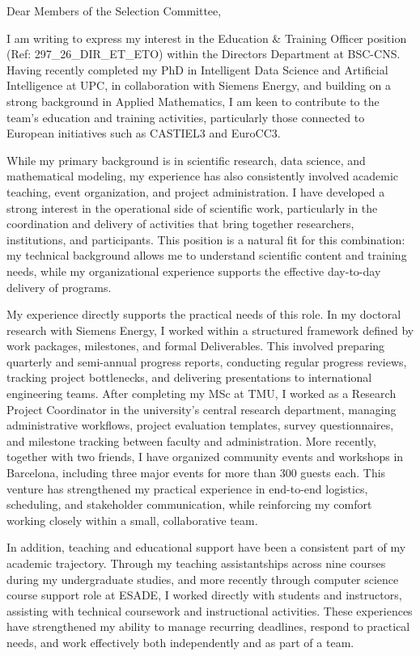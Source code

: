 \documentclass[11pt,a4paper]{article}
\begin{document}
\thispagestyle{empty}

Dear Members of the Selection Committee,

I am writing to express my interest in the Education \& Training Officer position (Ref: 297\_26\_\allowbreak DIR\_\allowbreak ET\_\allowbreak ETO) within the Directors Department at BSC-CNS. Having recently completed my PhD in Intelligent Data Science and Artificial Intelligence at UPC, in collaboration with Siemens Energy, and building on a strong background in Applied Mathematics, I am keen to contribute to the team's education and training activities, particularly those connected to European initiatives such as CASTIEL3 and EuroCC3.

While my primary background is in scientific research, data science, and mathematical modeling, my experience has also consistently involved academic teaching, event organization, and project administration. I have developed a strong interest in the operational side of scientific work, particularly in the coordination and delivery of activities that bring together researchers, institutions, and participants. This position is a natural fit for this combination: my technical background allows me to understand scientific content and training needs, while my organizational experience supports the effective day-to-day delivery of programs.

My experience directly supports the practical needs of this role. In my doctoral research with Siemens Energy, I worked within a structured framework defined by work packages, milestones, and formal Deliverables. This involved preparing quarterly and semi-annual progress reports, conducting regular progress reviews, tracking project bottlenecks, and delivering presentations to international engineering teams. After completing my MSc at TMU, I worked as a Research Project Coordinator in the university’s central research department, managing administrative workflows, project evaluation templates, survey questionnaires, and milestone tracking between faculty and administration. More recently, together with two friends, I have organized community events and workshops in Barcelona, including three major events for more than 300 guests each. This venture has strengthened my practical experience in end-to-end logistics, scheduling, and stakeholder communication, while reinforcing my comfort working closely within a small, collaborative team.

In addition, teaching and educational support have been a consistent part of my academic trajectory. Through my teaching assistantships across nine courses during my undergraduate studies, and more recently through computer science course support role at ESADE, I worked directly with students and instructors, assisting with technical coursework and instructional activities. These experiences have strengthened my ability to manage recurring deadlines, respond to practical needs, and work effectively both independently and as part of a team.
\end{document}
